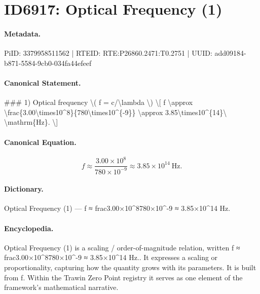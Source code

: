 \section*{ID6917: Optical Frequency (1)}
\paragraph{Metadata.}
PiID: 3379958511562 | RTEID: RTE:P26860.2471:T0.2751 | UUID: add09184-b871-5584-9cb0-034fa44efeef

\paragraph{Canonical Statement.}
\#\#\# 1) Optical frequency \textbackslash{}( f = c/\textbackslash{}lambda \textbackslash{}) \textbackslash{}[ f \textbackslash{}approx \textbackslash{}frac\{3.00\textbackslash{}times10\textasciicircum{}8\}\{780\textbackslash{}times10\textasciicircum{}\{-9\}\} \textbackslash{}approx 3.85\textbackslash{}times10\textasciicircum{}\{14\}\textbackslash{} \textbackslash{}mathrm\{Hz\}. \textbackslash{}]

\paragraph{Canonical Equation.}
\[
f \approx \frac{3.00\times10^8}{780\times10^{-9}} \approx 3.85\times10^{14}\ \mathrm{Hz}.
\]

\paragraph{Dictionary.}
Optical Frequency (1) — f ≈ frac3.00×10\textasciicircum{}8780×10\textasciicircum{}-9 ≈ 3.85×10\textasciicircum{}14 Hz.

\paragraph{Encyclopedia.}
Optical Frequency (1) is a scaling / order-of-magnitude relation, written f ≈ frac3.00×10\textasciicircum{}8780×10\textasciicircum{}-9 ≈ 3.85×10\textasciicircum{}14 Hz.. It expresses a scaling or proportionality, capturing how the quantity grows with its parameters. It is built from f. Within the Trawin Zero Point registry it serves as one element of the framework's mathematical narrative.
